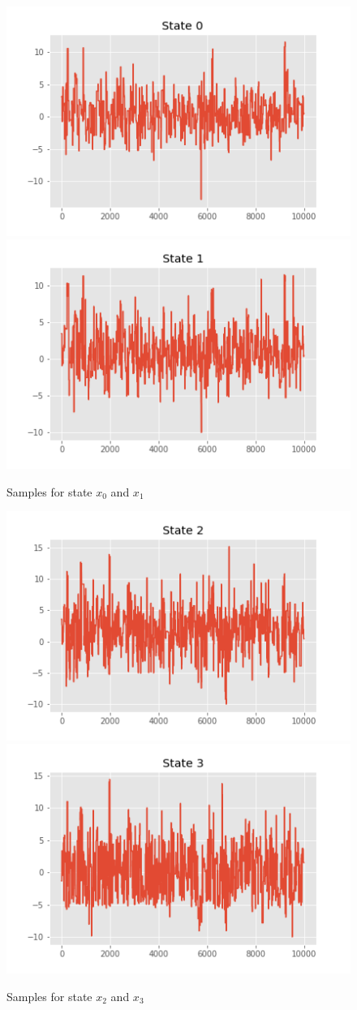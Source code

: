 \documentclass[]{article}
\begin{document}
\begin{figure}[H]
	\begin{center}
		\includegraphics[width=.4\textwidth]{task2/figures/T_2_2/Q1/plt_x0.png}
		\includegraphics[width=.4\textwidth]{task2/figures/T_2_2/Q1/plt_x1.png}
		
		\caption*{Samples for state $x_0$ and $x_1$}
	\end{center}
\end{figure}

\begin{figure}[H]
	\begin{center}
				
		\includegraphics[width=.4\textwidth]{task2/figures/T_2_2/Q1/plt_x2.png}
		\includegraphics[width=.4\textwidth]{task2/figures/T_2_2/Q1/plt_x3.png}
		
		\caption*{Samples for state $x_2$ and $x_3$}
	\end{center}
\end{figure}
\end{document}
